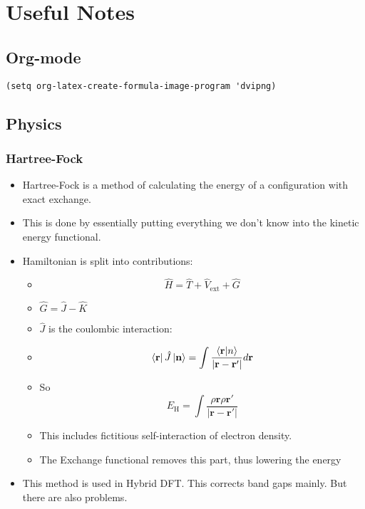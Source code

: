 \documentclass[11pt]{article}
\begin{document}
\section{Useful Notes}
\label{sec:org286228f}
\subsection{Org-mode}
\label{sec:orga8f61f0}
\begin{verbatim}
(setq org-latex-create-formula-image-program 'dvipng)
\end{verbatim}

\subsection{Physics}
\label{sec:orgaac880f}
\subsubsection{Hartree-Fock}
\label{sec:org1d7d2f0}
\begin{itemize}
\item Hartree-Fock is a method of calculating the energy of a configuration
with exact exchange.
\item This is done by essentially putting everything we don't know into the
kinetic energy functional.
\item Hamiltonian is split into contributions:
\begin{itemize}
\item \[\hat{H} = \hat{T} + \hat{V}_{ \text{ext} } + \hat{G}\]
\item \(\hat{G} = \hat{J} - \hat{K}\)
\item \(\hat{J}\) is the coulombic interaction:
\item \[ \bra{ \mathbf{r} } \hat{J} \ket{ \mathbf{n} } = \int \frac{ \bra{\mathbf{r}}\ket{n} }{|\mathbf{r} - \mathbf{r'}  |}d\mathbf{r} \]
\item So \[ E_{\text{H}} = \int \frac{\rho{\mathbf{r}\rho{\mathbf{r}'}}}{|\mathbf{r} - \mathbf{r'}|}\]
\item This includes fictitious self-interaction of electron density.
\item The Exchange functional removes this part, thus lowering the energy
\end{itemize}

\item This method is used in Hybrid DFT. This corrects band gaps mainly. But
there are also problems.
\end{itemize}
\end{document}
